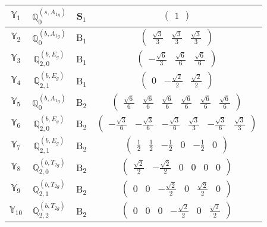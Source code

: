 \documentclass[fleqn,10pt,landscape]{article}
\begin{document}
\begin{itemize}
\begin{center}
\begin{longtable}{c|c|c|c}
$ \mathbb{Y}_{1} $ & $\mathbb{Q}_{0}^{(s,A_{1g})}$ & S$_{1}$ & $\begin{pmatrix} 1 \end{pmatrix}$ \\ \hline
$ \mathbb{Y}_{2} $ & $\mathbb{Q}_{0}^{(b,A_{1g})}$ & B$_{1}$ & $\begin{pmatrix} \frac{\sqrt{3}}{3} & \frac{\sqrt{3}}{3} & \frac{\sqrt{3}}{3} \end{pmatrix}$ \\
$ \mathbb{Y}_{3} $ & $\mathbb{Q}_{2,0}^{(b,E_{g})}$ & B$_{1}$ & $\begin{pmatrix} - \frac{\sqrt{6}}{3} & \frac{\sqrt{6}}{6} & \frac{\sqrt{6}}{6} \end{pmatrix}$ \\
$ \mathbb{Y}_{4} $ & $\mathbb{Q}_{2,1}^{(b,E_{g})}$ & B$_{1}$ & $\begin{pmatrix} 0 & - \frac{\sqrt{2}}{2} & \frac{\sqrt{2}}{2} \end{pmatrix}$ \\ \hline
$ \mathbb{Y}_{5} $ & $\mathbb{Q}_{0}^{(b,A_{1g})}$ & B$_{2}$ & $\begin{pmatrix} \frac{\sqrt{6}}{6} & \frac{\sqrt{6}}{6} & \frac{\sqrt{6}}{6} & \frac{\sqrt{6}}{6} & \frac{\sqrt{6}}{6} & \frac{\sqrt{6}}{6} \end{pmatrix}$ \\
$ \mathbb{Y}_{6} $ & $\mathbb{Q}_{2,0}^{(b,E_{g})}$ & B$_{2}$ & $\begin{pmatrix} - \frac{\sqrt{3}}{6} & - \frac{\sqrt{3}}{6} & - \frac{\sqrt{3}}{6} & \frac{\sqrt{3}}{3} & - \frac{\sqrt{3}}{6} & \frac{\sqrt{3}}{3} \end{pmatrix}$ \\
$ \mathbb{Y}_{7} $ & $\mathbb{Q}_{2,1}^{(b,E_{g})}$ & B$_{2}$ & $\begin{pmatrix} \frac{1}{2} & \frac{1}{2} & - \frac{1}{2} & 0 & - \frac{1}{2} & 0 \end{pmatrix}$ \\
$ \mathbb{Y}_{8} $ & $\mathbb{Q}_{2,0}^{(b,T_{2g})}$ & B$_{2}$ & $\begin{pmatrix} \frac{\sqrt{2}}{2} & - \frac{\sqrt{2}}{2} & 0 & 0 & 0 & 0 \end{pmatrix}$ \\
$ \mathbb{Y}_{9} $ & $\mathbb{Q}_{2,1}^{(b,T_{2g})}$ & B$_{2}$ & $\begin{pmatrix} 0 & 0 & - \frac{\sqrt{2}}{2} & 0 & \frac{\sqrt{2}}{2} & 0 \end{pmatrix}$ \\
$ \mathbb{Y}_{10} $ & $\mathbb{Q}_{2,2}^{(b,T_{2g})}$ & B$_{2}$ & $\begin{pmatrix} 0 & 0 & 0 & - \frac{\sqrt{2}}{2} & 0 & \frac{\sqrt{2}}{2} \end{pmatrix}$ \\

\end{longtable}
\end{center}
\end{itemize}
\end{document}
